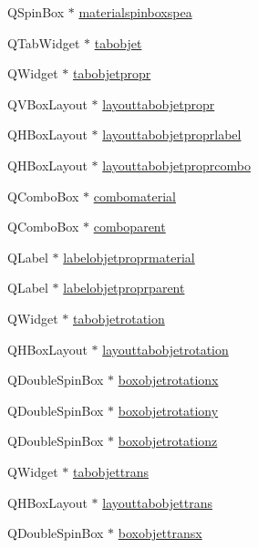 \begin{DoxyCompactItemize}
Q\+Spin\+Box $\ast$ \hyperlink{class_mondock_a62de223ddabe875e9406fd43b892a8a0}{materialspinboxspea}
\item 
Q\+Tab\+Widget $\ast$ \hyperlink{class_mondock_a3f12af44327a1739e8818ee91649ebbf}{tabobjet}
\item 
Q\+Widget $\ast$ \hyperlink{class_mondock_adc331c4d8373b45e636757e12a2bd5a0}{tabobjetpropr}
\item 
Q\+V\+Box\+Layout $\ast$ \hyperlink{class_mondock_ac56ddde4fb8bc59837027ed14f8b19d8}{layouttabobjetpropr}
\item 
Q\+H\+Box\+Layout $\ast$ \hyperlink{class_mondock_a933e33341a7ad640413b19c6d811559a}{layouttabobjetproprlabel}
\item 
Q\+H\+Box\+Layout $\ast$ \hyperlink{class_mondock_a666eed2f58369dbaea12c10c9c5f4888}{layouttabobjetproprcombo}
\item 
Q\+Combo\+Box $\ast$ \hyperlink{class_mondock_ab8773b4c45e6e0e13a9bb22793e3c870}{combomaterial}
\item 
Q\+Combo\+Box $\ast$ \hyperlink{class_mondock_a32ebd1f643a5f1b9749eb4f9d4940973}{comboparent}
\item 
Q\+Label $\ast$ \hyperlink{class_mondock_ac49c211334c5b4502c99dc47ff86fe1c}{labelobjetproprmaterial}
\item 
Q\+Label $\ast$ \hyperlink{class_mondock_a4d76ec3b85d44b07f7147f5b2a7c68a7}{labelobjetproprparent}
\item 
Q\+Widget $\ast$ \hyperlink{class_mondock_a917509c60bf1cd3eff74b0bd9c606dae}{tabobjetrotation}
\item 
Q\+H\+Box\+Layout $\ast$ \hyperlink{class_mondock_ab36da4ccb733ba45b30be8c325a593d9}{layouttabobjetrotation}
\item 
Q\+Double\+Spin\+Box $\ast$ \hyperlink{class_mondock_accc1854d02d6d2a0b61297b351bd196a}{boxobjetrotationx}
\item 
Q\+Double\+Spin\+Box $\ast$ \hyperlink{class_mondock_aeeea985e7f23ebf81696648d8e0dea40}{boxobjetrotationy}
\item 
Q\+Double\+Spin\+Box $\ast$ \hyperlink{class_mondock_af722379e41c8ebc43f6068754564aa4f}{boxobjetrotationz}
\item 
Q\+Widget $\ast$ \hyperlink{class_mondock_a8eee5e642f5cb6d30635c80417576622}{tabobjettrans}
\item 
Q\+H\+Box\+Layout $\ast$ \hyperlink{class_mondock_a1776a6148557d83c98a8a05368c08eef}{layouttabobjettrans}
\item 
Q\+Double\+Spin\+Box $\ast$ \hyperlink{class_mondock_a906d6de66e15f9b964d68947ac8ee94e}{boxobjettransx}

\end{DoxyCompactItemize}
